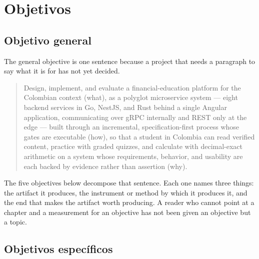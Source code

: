 \section{Objetivos}

\subsection{Objetivo general}

The general objective is one sentence because a project that needs a paragraph to
say what it is for has not yet decided.

\begin{quote}
Design, implement, and evaluate a financial-education platform for the Colombian
context (what), as a polyglot microservice system — eight backend services in Go,
NestJS, and Rust behind a single Angular application, communicating over gRPC
internally and REST only at the edge — built through an incremental,
specification-first process whose gates are executable (how), so that a student in
Colombia can read verified content, practice with graded quizzes, and calculate
with decimal-exact arithmetic on a system whose requirements, behavior, and
usability are each backed by evidence rather than assertion (why).
\end{quote}

The five objectives below decompose that sentence. Each one names three things: the
artifact it produces, the instrument or method by which it produces it, and the end
that makes the artifact worth producing. A reader who cannot point at a chapter and
a measurement for an objective has not been given an objective but a topic.

\subsection{Objetivos específicos}


